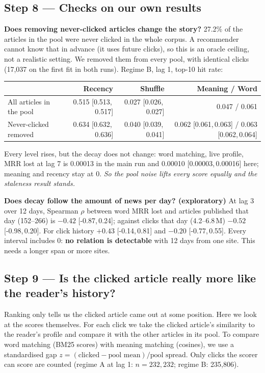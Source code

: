 \documentclass[11pt,a4paper]{article}
\newcommand{\ci}[2]{[#1,\,#2]}
\begin{document}
\subsection{Step 8 --- Checks on our own results}
\textbf{Does removing never-clicked articles change the story?} 27.2\% of the articles in the pool were never clicked in the whole corpus. A recommender cannot know that in advance (it uses future clicks), so this is an oracle ceiling, not a realistic setting. We removed them from every pool, with identical clicks (17,037 on the first fit in both runs). Regime B, lag 1, top-10 hit rate:
\begin{center}\small
\begin{tabular}{@{}lrrr@{}}
\toprule
 & Recency & Shuffle & Meaning / Word\\
\midrule
All articles in the pool & 0.515 \ci{0.513}{0.517} & 0.027 \ci{0.026}{0.027} & 0.047 / 0.061\\
Never-clicked removed & 0.634 \ci{0.632}{0.636} & 0.040 \ci{0.039}{0.041} & 0.062 \ci{0.061}{0.063} / 0.063 \ci{0.062}{0.064}\\
\bottomrule
\end{tabular}
\end{center}
Every level rises, but the decay does not change: word matching, live profile, MRR lost at lag 7 is 0.00013 in the main run and 0.00010 \ci{0.00003}{0.00016} here; meaning and recency stay at 0. \textit{So the pool noise lifts every score equally and the staleness result stands.}

\textbf{Does decay follow the amount of news per day? (exploratory)} At lag 3 over 12 days, Spearman $\rho$ between word MRR lost and articles published that day (152--266) is $-0.42$ \ci{-0.87}{0.24}; against clicks that day (4.2--6.8\,M) $-0.52$ \ci{-0.98}{0.20}. For click history $+0.43$ \ci{-0.14}{0.81} and $-0.20$ \ci{-0.77}{0.55}. Every interval includes 0: \textbf{no relation is detectable} with 12 days from one site. This needs a longer span or more sites.

\subsection{Step 9 --- Is the clicked article really more like the reader's history?}
Ranking only tells us the clicked article came out at some position. Here we look at the scores themselves. For each click we take the clicked article's similarity to the reader's profile and compare it with the other articles in its pool. To compare word matching (BM25 scores) with meaning matching (cosines), we use a standardised gap $z=(\text{clicked}-\text{pool mean})/\text{pool spread}$. Only clicks the scorer can score are counted (regime A at lag 1: $n=232{,}232$; regime B: 235{,}806).
\end{document}
